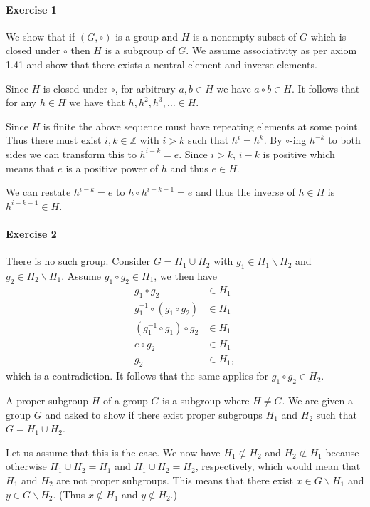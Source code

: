 \documentclass{article}
\begin{document}
\paragraph{Exercise 1}

We show that if $(G, \circ)$ is a group and $H$ is a nonempty subset of $G$ which is closed under $\circ$ then $H$ is a subgroup of $G$. We assume associativity as per axiom 1.41 and show that there exists a neutral element and inverse elements.

Since $H$ is closed under $\circ$, for arbitrary $a, b \in H$ we have $a \circ b \in H$. It follows that for any $h \in H$ we have that $h, h^2, h^3, \ldots \in H$.

Since $H$ is finite the above sequence must have repeating elements at some point. Thus there must exist $i, k \in \mathbb{Z}$ with $i > k$ such that $h^i = h^k$. By $\circ$-ing $h^{-k}$ to both sides we can transform this to $h^{i - k} = e$. Since $i > k$, $i - k$ is positive which means that $e$ is a positive power of $h$ and thus $e \in H$.

We can restate $h^{i - k} = e$ to $h \circ h^{i - k - 1} = e$ and thus the inverse of $h \in H$ is $h^{i - k - 1} \in H$.

\paragraph{Exercise 2}

There is no such group. Consider $G = H_1 \cup H_2$ with $g_1 \in H_1 \backslash H_2$ and $g_2 \in H_2 \backslash H_1$. Assume $g_1 \circ g_2 \in H_1$, we then have
\begin{align*}
    g_1 \circ g_2 &\in H_1 \\
    g_{1}^{-1} \circ (g_1 \circ g_2) &\in H_1 \\
    (g_{1}^{-1} \circ g_1) \circ g_2 &\in H_1 \\
    e \circ g_2 &\in H_1 \\
    g_2 &\in H_1,
\end{align*}
which is a contradiction. It follows that the same applies for $g_1 \circ g_2 \in H_2$.

A proper subgroup $H$ of a group $G$ is a subgroup where $H \neq G$. We are given a group $G$ and asked to show if there exist proper subgroups $H_1$ and $H_2$ such that $G = H_1 \cup H_2$.

Let us assume that this is the case. We now have $H_1 \not\subset H_2$ and $H_2 \not\subset H_1$ because otherwise $H_1 \cup H_2 = H_1$ and $H_1 \cup H_2 = H_2$, respectively, which would mean that $H_1$ and $H_2$ are not proper subgroups. This means that there exist $x \in G \backslash H_1$ and $y \in G \backslash H_2$. (Thus $x \not\in H_1$ and $y \not\in H_2$.)
\end{document}
